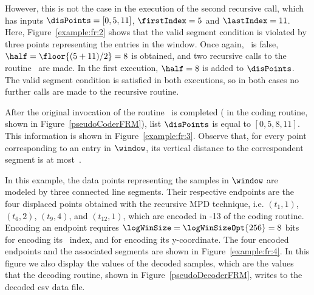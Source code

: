 \clearpage




However, this is not the case in the execution of the second recursive call, which has inputs $\disPoints=[0, 5, 11]$, $\firstIndex = 5$ and $\lastIndex = 11$. Here, Figure~\ref{example:fr:2} shows that the valid segment condition is violated by three points representing the entries in the window. Once again, \validSegment\ is false, $\half=\floor{(5 + 11) / 2}=8$ is obtained, and two recursive calls to the routine \getDisplacedPointsMethod\ are made. In the first execution, $\half=8$ is added to $\disPoints$. The valid segment condition is satisfied in both executions, so in both cases no further calls are made to the recursive routine. 


After the original invocation of the routine \getDisplacedPointsMethod\ is completed ( in the coding routine, shown in Figure~\ref{pseudoCoderFRM}), list $\disPoints$ is equal to $[0, 5, 8, 11]$. This information is shown in Figure~\ref{example:fr:3}. Observe that, for every point corresponding to an entry in $\window$, its vertical distance to the correspondent segment is at most~\maxerror.




\clearpage


In this example, the data points representing the samples in $\window$ are modeled by three connected line segments. Their respective endpoints are the four displaced points obtained with the recursive MPD technique, i.e. $(t_1, 1)$, $(t_6, 2)$, $(t_9, 4)$, and $(t_{12}, 1)$, which are encoded in -13 of the coding routine. Encoding an endpoint requires $\logWinSize = \logWinSizeOpt{256}=8$ bits for encoding its \window\ index, and \tobitexp for encoding its y-coordinate. The four encoded endpoints and the associated segments are shown in Figure~\ref{example:fr:4}. In this figure we also display the values of the decoded samples, which are the values that the decoding routine, shown in Figure~\ref{pseudoDecoderFRM}, writes to the decoded csv data file. 




\clearpage

